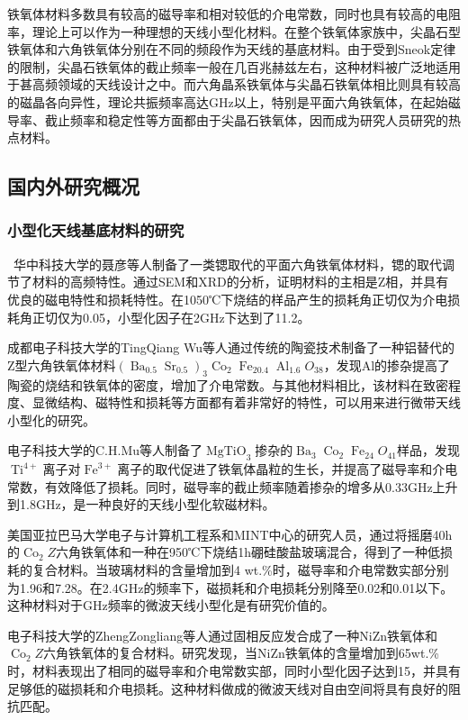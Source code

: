 \documentclass{article}
\newcommand{\tmop}[1]{\ensuremath{\operatorname{#1}}}
\begin{document}
铁氧体材料多数具有较高的磁导率和相对较低的介电常数，同时也具有较高的电阻率，理论上可以作为一种理想的天线小型化材料。在整个铁氧体家族中，尖晶石型铁氧体和六角铁氧体分别在不同的频段作为天线的基底材料。由于受到Sneok定律的限制，尖晶石铁氧体的截止频率一般在几百兆赫兹左右，这种材料被广泛地适用于甚高频领域的天线设计之中。而六角晶系铁氧体与尖晶石铁氧体相比则具有较高的磁晶各向异性，理论共振频率高达GHz以上，特别是平面六角铁氧体，在起始磁导率、截止频率和稳定性等方面都由于尖晶石铁氧体，因而成为研究人员研究的热点材料。

\subsection{国内外研究概况}

\subsubsection{小型化天线基底材料的研究}

\
华中科技大学的聂彦等人{\cite{lzs-nieyan}}制备了一类锶取代的平面六角铁氧体材料，锶的取代调节了材料的高频特性。通过SEM和XRD的分析，证明材料的主相是Z相，并具有优良的磁电特性和损耗特性。在1050℃下烧结的样品产生的损耗角正切仅为介电损耗角正切仅为0.05，小型化因子在2GHz下达到了11.2。

成都电子科技大学的TingQiang
Wu等人通过传统的陶瓷技术制备了一种铝替代的Z型六角铁氧体材料$\left(
\tmop{Ba}_{0.5} \tmop{Sr}_{0.5} \right)_3 \tmop{Co}_2 \tmop{Fe}_{20.4}
\tmop{Al}_{1.6}
O_{38}$，发现Al的掺杂提高了陶瓷的烧结和铁氧体的密度，增加了介电常数。与其他材料相比，该材料在致密程度、显微结构、磁特性和损耗等方面都有着非常好的特性，可以用来进行微带天线小型化的研究。

电子科技大学的C.H.Mu等人制备了$\tmop{MgTiO}_3$掺杂的$\tmop{Ba}_3
\tmop{Co}_2 \tmop{Fe}_{24} O_{41}$样品，发现$\tmop{Ti}^{4
+}$离子对$\tmop{Fe}^{3
+}$离子的取代促进了铁氧体晶粒的生长，并提高了磁导率和介电常数，有效降低了损耗。同时，磁导率的截止频率随着掺杂的增多从0.33GHz上升到1.8GHz，是一种良好的天线小型化软磁材料。

美国亚拉巴马大学电子与计算机工程系和MINT中心的研究人员，通过将摇磨40h的$\tmop{Co}_2
Z$六角铁氧体和一种在950℃下烧结1h硼硅酸盐玻璃混合，得到了一种低损耗的复合材料。当玻璃材料的含量增加到4
wt.\%时，磁导率和介电常数实部分别为1.96和7.28。在2.4GHz的频率下，磁损耗和介电损耗分别降至0.02和0.01以下。这种材料对于GHz频率的微波天线小型化是有研究价值的。

电子科技大学的ZhengZongliang等人通过固相反应发合成了一种NiZn铁氧体和$\tmop{Co}_2
Z$六角铁氧体的复合材料。研究发现，当NiZn铁氧体的含量增加到65wt.\%时，材料表现出了相同的磁导率和介电常数实部，同时小型化因子达到15，并具有足够低的磁损耗和介电损耗。这种材料做成的微波天线对自由空间将具有良好的阻抗匹配。
\end{document}
